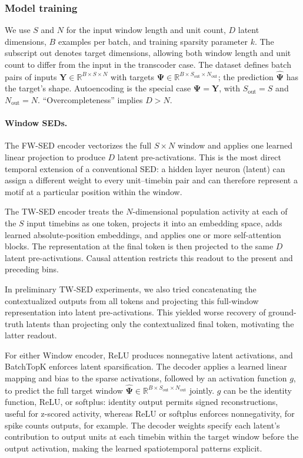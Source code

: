 \subsubsection{Model training}
\label{subsubsection:model_architecture_training}

We use $S$ and $N$ for the input window length and unit count, $D$ latent dimensions, $B$ examples per batch, and training sparsity parameter $k$. The subscript $\mathrm{out}$ denotes target dimensions, allowing both window length and unit count to differ from the input in the transcoder case. The dataset defines batch pairs of inputs $\mathbf{Y}\in\mathbb{R}^{B\times S\times N}$ with targets $\mathbf{\Psi}\in\mathbb{R}^{B\times S_{\mathrm{out}}\times N_{\mathrm{out}}}$; the prediction $\hat{\mathbf{\Psi}}$ has the target's shape. Autoencoding is the special case $\mathbf{\Psi}=\mathbf{Y}$, with $S_{\mathrm{out}}=S$ and $N_{\mathrm{out}}=N$. ``Overcompleteness'' implies $D>N$.

\paragraph{Window SEDs.}
The FW-SED encoder vectorizes the full $S\times N$ window and applies one learned linear projection to produce $D$ latent pre-activations. This is the most direct temporal extension of a conventional SED: a hidden layer neuron (latent) can assign a different weight to every unit--timebin pair and can therefore represent a motif at a particular position within the window. 

The TW-SED encoder treats the $N$-dimensional population activity at each of the $S$ input timebins as one token, projects it into an embedding space, adds learned absolute-position embeddings, and applies one or more self-attention blocks. The representation at the final token is then projected to the same $D$ latent pre-activations. Causal attention restricts this readout to the present and preceding bins.

In preliminary TW-SED experiments, we also tried concatenating the contextualized outputs from all tokens and projecting this full-window representation into latent pre-activations. This yielded worse recovery of ground-truth latents than projecting only the contextualized final token, motivating the latter readout.

For either Window encoder, ReLU produces nonnegative latent activations, and BatchTopK enforces latent sparsification. The decoder applies a learned linear mapping and bias to the sparse activations, followed by an activation function $g$, to predict the full target window $\hat{\mathbf{\Psi}}\in\mathbb{R}^{B\times S_{\mathrm{out}}\times N_{\mathrm{out}}}$ jointly. $g$ can be the identity function, ReLU, or softplus: identity output permits signed reconstructions, useful for z-scored activity, whereas ReLU or softplus enforces nonnegativity, for spike counts outputs, for example. The decoder weights specify each latent's contribution to output units at each timebin within the target window before the output activation, making the learned spatiotemporal patterns explicit.

